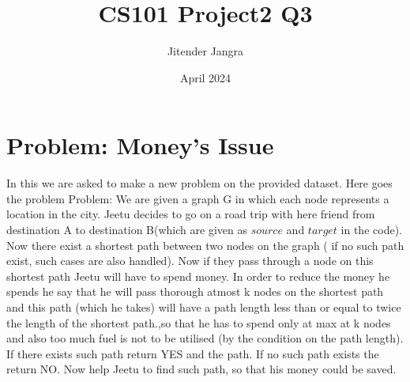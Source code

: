 \documentclass{article}
\title{CS101 Project2 Q3}
\author{Jitender Jangra}
\date{April 2024}
\begin{document}
\maketitle

\section{Problem: Money's Issue}
In this we are asked to make a new problem on the provided dataset.
Here goes the problem\newline
Problem: \newline
We are given a graph G in which each node represents a location in the city. Jeetu decides to go on a road trip with here friend from destination A to destination B(which are given as $source$ and $target$ in the code). Now there exist a shortest path between two nodes on the graph ( if no such path exist, such cases are also handled). Now if they pass through a node on this shortest path Jeetu will have to spend money. In order to reduce the money he spends he say that he will pass thorough atmost k nodes on the shortest path and this path (which he takes) will have a path length less than or equal to  twice the length of the shortest path.,so that he has to spend only at max at k nodes and also too much fuel is not to be utilised (by the condition on the path length). If there exists such path return YES and the path. If no such path exists the return NO.\newline
Now help Jeetu to find such path, so that his money could be saved.
\end{document}
